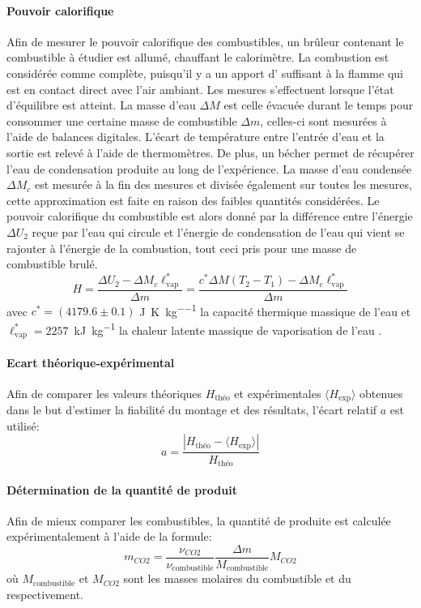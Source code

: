 \paragraph*{Pouvoir calorifique}
Afin de mesurer le pouvoir calorifique des combustibles, un brûleur contenant le combustible à étudier est allumé, chauffant le calorimètre. La combustion est considérée comme complète, puisqu'il y a un apport d' suffisant à la flamme qui est en contact direct avec l'air ambiant. Les mesures s'effectuent lorsque l'état d'équilibre est atteint. La masse d'eau \(\Delta M\) est celle évacuée durant le temps pour consommer une certaine masse de combustible \(\Delta m\), celles-ci sont mesurées à l'aide de balances digitales. L'écart de température entre l'entrée d'eau et la sortie est relevé à l'aide de thermomètres. De plus, un bécher permet de récupérer l'eau de condensation produite au long de l'expérience. La masse d'eau condensée \(\Delta M_c\) est mesurée à la fin des mesures et divisée également sur toutes les mesures, cette approximation est faite en raison des faibles quantités considérées. Le pouvoir calorifique du combustible est alors donné par la différence entre l'énergie \(\Delta U_2\) reçue par l'eau qui circule et l'énergie de condensation de l'eau qui vient se rajouter à l'énergie de la combustion, tout ceci pris pour une masse de combustible brulé.
\begin{equation}
    H = \frac{\Delta U_2 - \Delta M_c \ell_\textrm{vap}^*}{\Delta m} = \frac{c^* \Delta M (T_2 - T_1) - \Delta M_c \ell_\textrm{vap}^*}{\Delta m}
    \label{eq:pouvoir_calorifique}
\end{equation}
avec \(c^* = (4179.6 \pm 0.1)\) \si{\joule\per\kelvin\per\kilo\gram} la capacité thermique massique de l'eau \cite{capacite-eau} et \mbox{\(\ell_\textrm{vap}^* = 2257\) \si{\kilo\joule\per\kilo\gram}} la chaleur latente massique de vaporisation de l'eau \cite{notice}.


\paragraph*{Ecart théorique-expérimental}
Afin de comparer les valeurs théoriques \(H_\textrm{théo}\) et expérimentales \(\langle H_\textrm{exp} \rangle\) obtenues dans le but d'estimer la fiabilité du montage et des résultats, l'écart relatif \(a\) est utilisé:
\begin{equation}
    a = \frac{ |H_\textrm{théo} - \langle H_\textrm{exp} \rangle| }{ H_\textrm{théo} }
    \label{eq:ecart_rel}
\end{equation}

\paragraph*{Détermination de la quantité de  produit}
Afin de mieux comparer les combustibles, la quantité de  produite est calculée expérimentalement à l'aide de la formule:
\begin{equation}
    m_{CO2} = \frac{\nu_{CO2}}{\nu_\textrm{combustible}} \frac{\Delta m}{M_\textrm{combustible}}M_{CO2}
    \label{eq:masse_co2}
\end{equation}
où \(M_\textrm{combustible}\) et \(M_{CO2}\) sont les masses molaires du combustible et du  respectivement.
